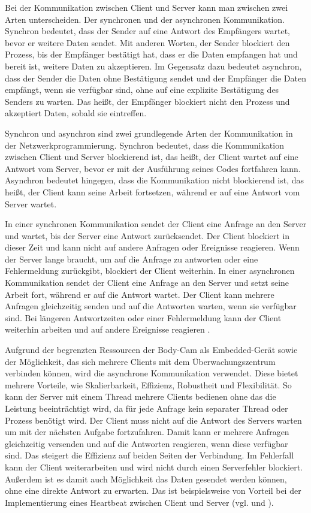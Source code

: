 \documentclass[thesis.tex]{subfiles}
\begin{document}
Bei der Kommunikation zwischen Client und Server kann man zwischen zwei Arten unterscheiden.
Der synchronen und der asynchronen Kommunikation.
Synchron bedeutet, dass der Sender auf eine Antwort des Empfängers wartet, bevor er weitere Daten sendet.
Mit anderen Worten, der Sender blockiert den Prozess, bis der Empfänger bestätigt hat, dass er die Daten empfangen hat und bereit ist, weitere Daten zu akzeptieren.
Im Gegensatz dazu bedeutet asynchron, dass der Sender die Daten ohne Bestätigung sendet und der Empfänger die Daten empfängt, wenn sie verfügbar sind, ohne auf eine explizite Bestätigung des Senders zu warten.
Das heißt, der Empfänger blockiert nicht den Prozess und akzeptiert Daten, sobald sie eintreffen.

Synchron und asynchron sind zwei grundlegende Arten der Kommunikation in der Netzwerkprogrammierung.
Synchron bedeutet, dass die Kommunikation zwischen Client und Server blockierend ist, das heißt, der Client wartet auf eine Antwort vom Server, bevor er mit der Ausführung seines Codes fortfahren kann.
Asynchron bedeutet hingegen, dass die Kommunikation nicht blockierend ist, das heißt, der Client kann seine Arbeit fortsetzen, während er auf eine Antwort vom Server wartet.

In einer synchronen Kommunikation sendet der Client eine Anfrage an den Server und wartet, bis der Server eine Antwort zurücksendet.
Der Client blockiert in dieser Zeit und kann nicht auf andere Anfragen oder Ereignisse reagieren.
Wenn der Server lange braucht, um auf die Anfrage zu antworten oder eine Fehlermeldung zurückgibt, blockiert der Client weiterhin.
In einer asynchronen Kommunikation sendet der Client eine Anfrage an den Server und setzt seine Arbeit fort, während er auf die Antwort wartet.
Der Client kann mehrere Anfragen gleichzeitig senden und auf die Antworten warten, wenn sie verfügbar sind.
Bei längeren Antwortzeiten oder einer Fehlermeldung kann der Client weiterhin arbeiten und auf andere Ereignisse reagieren
\cite[vgl. S.1-3]{lim2019directly}.

Aufgrund der begrenzten Ressourcen der Body-Cam als Embedded-Gerät sowie der Möglichkeit, das sich mehrere Clients mit dem Überwachungszentrum verbinden können, wird die asynchrone Kommunikation verwendet.
Diese bietet mehrere Vorteile, wie Skalierbarkeit, Effizienz, Robustheit und Flexibilität.
So kann der Server mit einem Thread mehrere Clients bedienen ohne das die Leistung beeinträchtigt wird, da für jede Anfrage kein separater Thread oder Prozess benötigt wird.
Der Client muss nicht auf die Antwort des Servers warten um mit der nächsten Aufgabe fortzufahren.
Damit kann er mehrere Anfragen gleichzeitig versenden und auf die Antworten reagieren, wenn diese verfügbar sind.
Das steigert die Effizienz auf beiden Seiten der Verbindung.
Im Fehlerfall kann der Client weiterarbeiten und wird nicht durch einen Serverfehler blockiert.
Außerdem ist es damit auch Möglichkeit das Daten gesendet werden können, ohne eine direkte Antwort zu erwarten.
Das ist beispielsweise von Vorteil bei der Implementierung eines Heartbeat zwischen Client und Server
(vgl. \cite[]{whyAsync} und \cite[]{thinkAsync}).
\end{document}
